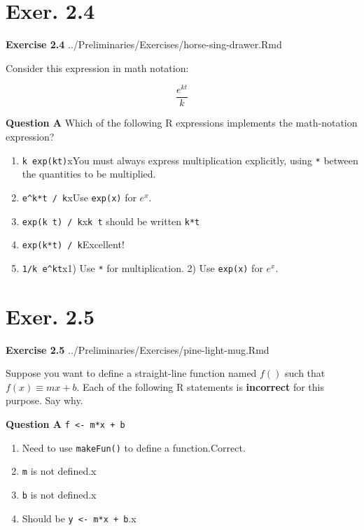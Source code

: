 \documentclass[
  letterpaper,
  DIV=11,
  numbers=noendperiod,
  oneside]{article}
\providecommand{\tightlist}{%
  \setlength{\itemsep}{0pt}\setlength{\parskip}{0pt}}\usepackage{longtable,booktabs,array}
\begin{document}
\begin{multicols}{2}
\hypertarget{exer.-2.4}{%
\section*{Exer. 2.4}\label{exer.-2.4}}

\textbf{Exercise 2.4} ../Preliminaries/Exercises/horse-sing-drawer.Rmd

Consider this expression in math notation:

\[\frac{e^{k t}}{k}\]

\textbf{Question A} Which of the following R expressions implements the
math-notation expression?

\begin{enumerate}
\def\labelenumi{\roman{enumi}.}
\tightlist
\item
  {\texttt{k\ exp(kt)}{xYou must always express multiplication
  explicitly, using \texttt{*} between the quantities to be
  multiplied.}}\\
\item
  {\texttt{e\^{}k*t\ /\ k}{xUse \texttt{exp(x)} for \(e^x\).}}\\
\item
  {\texttt{exp(k\ t)\ /\ k}{x\texttt{k\ t} should be written
  \texttt{k*t}}}\\
\item
  {\texttt{exp(k*t)\ /\ k}{Excellent!~}}\\
\item
  {\texttt{1/k\ e\^{}kt}{x1) Use \texttt{*} for multiplication. 2) Use
  \texttt{exp(x)} for \(e^x\).}}
\end{enumerate}

\hypertarget{exer.-2.5}{%
\section*{Exer. 2.5}\label{exer.-2.5}}

\textbf{Exercise 2.5} ../Preliminaries/Exercises/pine-light-mug.Rmd

Suppose you want to define a straight-line function named \(f()\) such
that \(f(x)\equiv m x + b\). Each of the following R statements is
\textbf{incorrect} for this purpose. Say why.

\textbf{Question A} \texttt{f\ \textless{}-\ m*x\ +\ b}

\begin{enumerate}
\def\labelenumi{\roman{enumi}.}
\tightlist
\item
  {Need to use \texttt{makeFun()} to define a function.{Correct.~}}\\
\item
  {\texttt{m} is not defined.{x}}\\
\item
  {\texttt{b} is not defined.{x}}\\
\item
  {Should be \texttt{y\ \textless{}-\ m*x\ +\ b}.{x}}
\end{enumerate}


\end{multicols}
\end{document}
